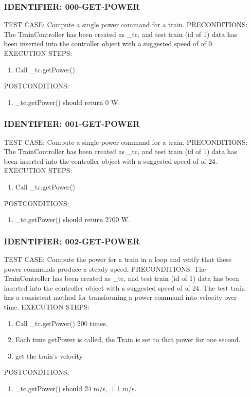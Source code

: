 \documentclass{scrreprt}
\begin{document}
\subsubsection{IDENTIFIER: 000-GET-POWER}
TEST CASE: Compute a single power command for a train.
PRECONDITIONS: The TrainController has been created as _tc, and test train (id of 1) data has been inserted into the controller object with a suggested speed of of 0.
EXECUTION STEPS:
\begin{enumerate}
	\item Call _tc.getPower()
\end{enumerate}
POSTCONDITIONS:
\begin{enumerate}
	\item _tc.getPower() should return 0 W.
\end{enumerate}

\subsubsection{IDENTIFIER: 001-GET-POWER}
TEST CASE: Compute a single power command for a train.
PRECONDITIONS: The TrainController has been created as _tc, and test train (id of 1) data has been inserted into the controller object with a suggested speed of of 24.
EXECUTION STEPS:
\begin{enumerate}
	\item Call _tc.getPower()
\end{enumerate}
POSTCONDITIONS:
\begin{enumerate}
	\item _tc.getPower() should return 2700 W.
\end{enumerate}

\subsubsection{IDENTIFIER: 002-GET-POWER}
TEST CASE: Compute the power for a train in a loop and verify that these power commands produce a steady speed.
PRECONDITIONS: The TrainController has been created as _tc, and test train (id of 1) data has been inserted into the controller object with a suggested speed of of 24.  The test train has a consistent method for transforming a power command into velocity over time.
EXECUTION STEPS:
\begin{enumerate}
	\item Call _tc.getPower() 200 times.
	\item Each time getPower is called, the Train is set to that power for one second.
	\item get the train's velocity
\end{enumerate}
POSTCONDITIONS:
\begin{enumerate}
	\item _tc.getPower() should 24 m/s, ± 1 m/s.
\end{enumerate}
\end{document}
